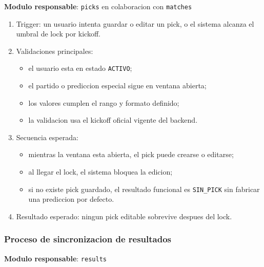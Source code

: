 \textbf{Modulo responsable}: \texttt{picks} en colaboracion con \texttt{matches}

\begin{enumerate}
  \item Trigger: un usuario intenta guardar o editar un pick, o el sistema alcanza el umbral de lock por kickoff.
  \item Validaciones principales:
    \begin{itemize}
      \item el usuario esta en estado \texttt{ACTIVO};
      \item el partido o prediccion especial sigue en ventana abierta;
      \item los valores cumplen el rango y formato definido;
      \item la validacion usa el kickoff oficial vigente del backend.
    \end{itemize}
  \item Secuencia esperada:
    \begin{itemize}
      \item mientras la ventana esta abierta, el pick puede crearse o editarse;
      \item al llegar el lock, el sistema bloquea la edicion;
      \item si no existe pick guardado, el resultado funcional es \texttt{SIN\_PICK} sin fabricar una prediccion por defecto.
    \end{itemize}
  \item Resultado esperado: ningun pick editable sobrevive despues del lock.
\end{enumerate}

\subsubsection{Proceso de sincronizacion de resultados}

\textbf{Modulo responsable}: \texttt{results}


